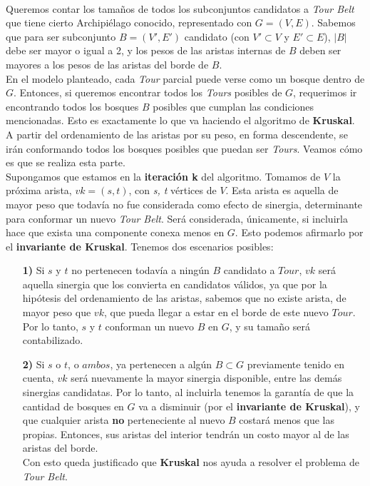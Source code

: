 \documentclass[../main.tex]{subfiles}
\begin{document}
\paragraph{} Queremos contar los tamaños de todos los subconjuntos candidatos a \textit{Tour Belt} que tiene cierto Archipiélago conocido, representado con \(G = (V, E)\). Sabemos que para ser subconjunto \(B = (V', E')\) candidato (con $V' \subset V$ y $E' \subset E$), $|B|$ debe ser mayor o igual a 2, y los pesos de las aristas internas de $B$ deben ser mayores a los pesos de las aristas del borde de $B$. \\
En el modelo planteado, cada \textit{Tour} parcial puede verse como un bosque dentro de $G$. Entonces, si queremos encontrar todos los \textit{Tours} posibles de $G$, requerimos ir encontrando todos los bosques $B$ posibles que cumplan las condiciones mencionadas. Esto es exactamente lo que va haciendo el algoritmo de \textbf{Kruskal}. A partir del ordenamiento de las aristas por su peso, en forma descendente, se ir\'an conformando todos los bosques posibles que puedan ser \textit{Tours}. Veamos cómo es que se realiza esta parte. \\
Supongamos que estamos en la \textbf{iteración k} del algoritmo. Tomamos de $V$ la próxima arista, \(vk =(s,t)\), con \textit{s, t} vértices de $V$. Esta arista es aquella de mayor peso que todavía no fue considerada como efecto de sinergia, determinante para conformar un nuevo \textit{Tour Belt}. Será considerada, únicamente, si incluirla hace que exista una componente conexa menos en $G$. 
Esto podemos afirmarlo por el \textbf{invariante de Kruskal}. Tenemos dos escenarios posibles:
\begin{itemize}
  \item[\textbf{1)}] Si $s$ y $t$ no pertenecen todavía a ningún $B$ candidato a $Tour$, $vk$ será aquella sinergia que los convierta en candidatos válidos, ya que por la hipótesis del ordenamiento de las aristas, sabemos que no existe arista, de mayor peso que $vk$, que pueda llegar a estar en el borde de este nuevo $Tour$. Por lo tanto, $s$ y $t$ conforman un nuevo $B$ en $G$, y su tamaño será contabilizado. 
  \item[\textbf{2)}] Si $s$ o $t$, o $ambos$, ya pertenecen a algún $B \subset G$ previamente tenido en cuenta, $vk$ será nuevamente la mayor sinergia disponible, entre las demás sinergias candidatas. Por lo tanto, al incluirla tenemos la garantía de que la cantidad de bosques en $G$ va a disminuir (por el \textbf{invariante de Kruskal}), y que cualquier arista \textbf{no} perteneciente al nuevo $B$ %
    costar\'a menos que las propias. Entonces, sus aristas del interior tendr\'an un costo mayor al de las aristas del borde. \\
  Con esto queda justificado que \textbf{Kruskal} nos ayuda a resolver el problema de \textit{Tour Belt}.
\end{itemize}
\end{document}
